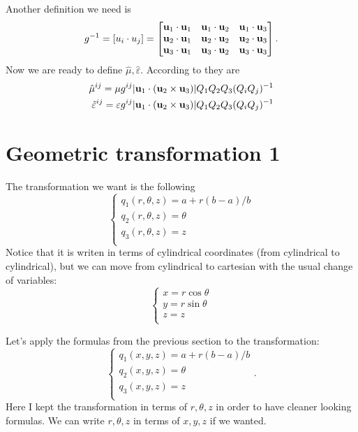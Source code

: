 \documentclass{amsart}
\begin{document}
Another definition we need is
\begin{equation}\label{matrixg}
  g^{-1}=[u_i\cdot u_j]=\begin{bmatrix}
    \textbf{u}_1\cdot \textbf{u}_1 & \textbf{u}_1\cdot \textbf{u}_2 & \textbf{u}_1\cdot \textbf{u}_3 \\
    \textbf{u}_2\cdot \textbf{u}_1 & \textbf{u}_2\cdot \textbf{u}_2 & \textbf{u}_2\cdot \textbf{u}_3 \\
    \textbf{u}_3\cdot \textbf{u}_1 & \textbf{u}_3\cdot \textbf{u}_2 & \textbf{u}_3\cdot \textbf{u}_3
  \end{bmatrix}.
\end{equation}
Now we are ready to define $\hat{\mu},\hat{\varepsilon}$. According to \cite{ward96} they are
\begin{align}
  \hat{\mu}^{ij}=\mu g^{ij}|\textbf{u}_1\cdot(\textbf{u}_2\times \textbf{u}_3)|Q_1Q_2Q_3(Q_iQ_j)^{-1}\\
  \hat{\varepsilon}^{ij}=\varepsilon g^{ij}|\textbf{u}_1\cdot(\textbf{u}_2\times \textbf{u}_3)|Q_1Q_2Q_3(Q_iQ_j)^{-1} \nonumber
\end{align}

\section{Geometric transformation 1}
The transformation we want is the following
\[\begin{cases}
  q_1(r,\theta,z)=a+r(b-a)/b\\
  q_2(r,\theta,z)=\theta\\
  q_3(r,\theta,z)=z\\
\end{cases}\]
Notice that it is writen in terms of cylindrical coordinates
(from cylindrical to cylindrical), but we can move from cylindrical
to cartesian with the usual change of variables:
\begin{equation}
  \begin{cases}\label{cylindrical}
  x=r\cos\theta\\
  y=r\sin\theta\\
  z=z\\
\end{cases}
\end{equation}

Let's apply the formulas from the previous section to the transformation:
\[\begin{cases}
  q_1(x,y,z)=a+r(b-a)/b\\
  q_2(x,y,z)=\theta\\
q_3(x,y,z)=z\\
\end{cases}.\]
Here I kept the transformation in terms of $r,\theta,z$ in order to have cleaner looking formulas.
We can write $r,\theta,z$ in terms of $x,y,z$ if we wanted.
\end{document}
